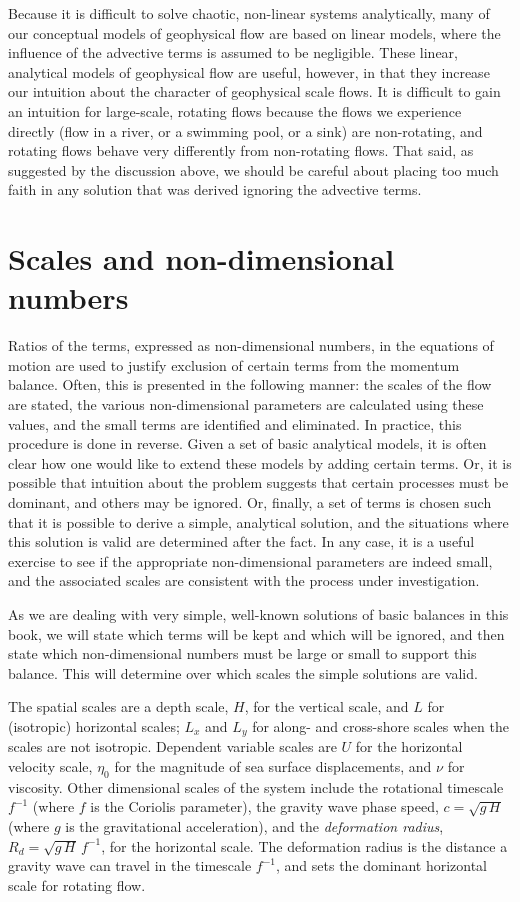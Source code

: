 \documentclass[11pt]{report}
\numberwithin{equation}{section}
\begin{document}
Because it is difficult to solve chaotic, non-linear systems analytically, many of our conceptual models of geophysical flow are based on linear models, where the influence of the advective terms is assumed to be negligible.  These linear, analytical models of geophysical flow are useful, however, in that they increase our intuition about the character of geophysical scale flows.  It is difficult to gain an intuition for large-scale, rotating flows because the flows we experience directly (flow in a river, or a swimming pool, or a sink) are non-rotating, and rotating flows behave very differently from non-rotating flows.  That said, as suggested by the discussion above, we should be careful about placing too much faith in any solution that was derived ignoring the advective terms.

\section{Scales and non-dimensional numbers}

Ratios of the terms, expressed as non-dimensional numbers, in the equations of motion are used to justify exclusion of certain terms from the momentum balance.  Often, this is presented in the following manner:  the scales of the flow are stated, the various non-dimensional parameters are calculated using these values, and the small terms are identified and eliminated.  In practice, this procedure is done in reverse.  Given a set of basic analytical models, it is often clear how one would like to extend these models by adding certain terms.  Or, it is possible that intuition about the problem suggests that certain processes must be dominant, and others may be ignored.  Or, finally, a set of terms is chosen such that it is possible to derive a simple, analytical solution, and the situations where this solution is valid are determined after the fact.  In any case, it is a useful exercise to see if the appropriate non-dimensional parameters are indeed small, and the associated scales are consistent with the process under investigation.

As we are dealing with very simple, well-known solutions of basic balances in this book, we will state which terms will be kept and which will be ignored, and then state which non-dimensional numbers must be large or small to support this balance.  This will determine over which scales the simple solutions are valid.

The spatial scales are a depth scale, $H$, for the vertical scale, and $L$ for (isotropic) horizontal scales; $L_x$ and $L_y$ for along- and cross-shore scales when the scales are not isotropic.  Dependent variable scales are $U$ for the horizontal velocity scale, $\eta_0$ for the magnitude of sea surface displacements, and $\nu$ for viscosity.  Other dimensional scales of the system include the rotational timescale $f^{-1}$ (where $f$ is the Coriolis parameter), the gravity wave phase speed, $c=\sqrt{g\,H}$ (where $g$ is the gravitational acceleration), and the {\it deformation radius}, $R_d=\sqrt{g\,H}\,f^{-1}$, for the horizontal scale.  The deformation radius is the distance a gravity wave can travel in the timescale $f^{-1}$, and sets the dominant horizontal scale for rotating flow.  
\end{document}
